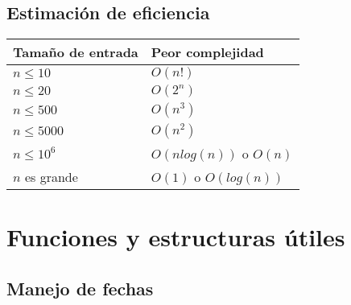 \documentclass[11pt]{article}
\begin{document}
\subsection{Estimación de eficiencia}

\begin{center}
    \begin{tabular}{ | l | l | }
        \hline
        Tamaño de entrada & Peor complejidad \\
        \hline
        $n \leq 10$ & $O(n!)$ \\
        $n \leq 20$ & $O(2^n)$ \\
        $n \leq 500$ & $O(n^3)$ \\
        $n \leq 5000$ & $O(n^2)$ \\
        $n \leq 10^6$ & $O(n log(n))$ o $O(n)$ \\
        $n$ es grande & $O(1)$ o $O(log(n))$ \\
        \hline
    \end{tabular}
\end{center}

\section{Funciones y estructuras útiles}

\subsection{Manejo de fechas}
\end{document}
